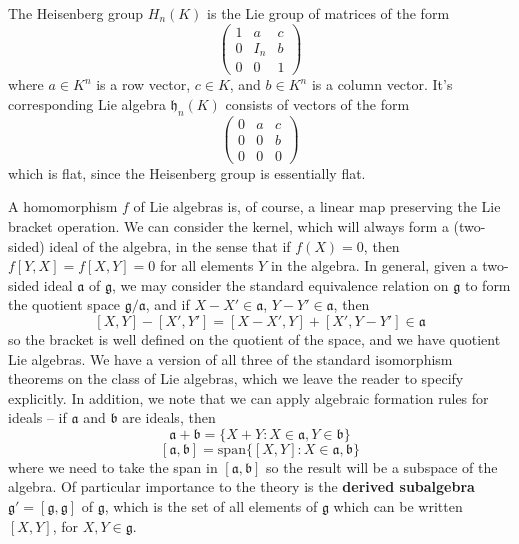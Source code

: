 \begin{example}
    The Heisenberg group $H_n(K)$ is the Lie group of matrices of the form
    \[ \begin{pmatrix} 1 & a & c \\ 0 & I_n & b \\ 0 & 0 & 1 \end{pmatrix} \]
    where $a \in K^n$ is a row vector, $c \in K$, and $b \in K^n$ is a column vector. It's corresponding Lie algebra $\mathfrak{h}_n(K)$ consists of vectors of the form
    \[ \begin{pmatrix} 0 & a & c \\ 0 & 0 & b \\ 0 & 0 & 0 \end{pmatrix} \]
    which is flat, since the Heisenberg group is essentially flat.
\end{example}

A homomorphism $f$ of Lie algebras is, of course, a linear map preserving the Lie bracket operation. We can consider the kernel, which will always form a (two-sided) ideal of the algebra, in the sense that if $f(X) = 0$, then $f[Y,X] = f[X,Y] = 0$ for all elements $Y$ in the algebra. In general, given a two-sided ideal $\mathfrak{a}$ of $\mathfrak{g}$, we may consider the standard equivalence relation on $\mathfrak{g}$ to form the quotient space $\mathfrak{g}/\mathfrak{a}$, and if $X - X' \in \mathfrak{a}$, $Y - Y' \in \mathfrak{a}$, then
%
\[ [X,Y] - [X',Y'] = [X-X',Y] + [X',Y-Y'] \in \mathfrak{a} \]
%
so the bracket is well defined on the quotient of the space, and we have quotient Lie algebras. We have a version of all three of the standard isomorphism theorems on the class of Lie algebras, which we leave the reader to specify explicitly. In addition, we note that we can apply algebraic formation rules for ideals -- if $\mathfrak{a}$ and $\mathfrak{b}$ are ideals, then
%
\[ \mathfrak{a} + \mathfrak{b} = \{ X + Y : X \in \mathfrak{a}, Y \in \mathfrak{b} \} \]
\[ [\mathfrak{a}, \mathfrak{b}] = \text{span} \{ [X,Y] : X \in \mathfrak{a}, \mathfrak{b} \} \]
%
where we need to take the span in $[\mathfrak{a}, \mathfrak{b}]$ so the result will be a subspace of the algebra. Of particular importance to the theory is the {\bf derived subalgebra} $\mathfrak{g}' = [\mathfrak{g}, \mathfrak{g}]$ of $\mathfrak{g}$, which is the set of all elements of $\mathfrak{g}$ which can be written $[X,Y]$, for $X,Y \in \mathfrak{g}$.

